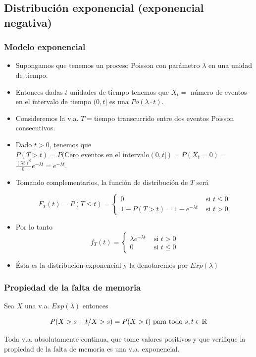 \subsection{Distribución exponencial (exponencial negativa)}
\begin{frame}

\frametitle{Modelo exponencial}

\begin{itemize}
\item      Supongamos que tenemos un proceso Poisson con parámetro $\lambda$ en una unidad de tiempo.
\item    Entonces dadas $t$ unidades de tiempo tenemos que $X_{t}=$ número de eventos en el intervalo de tiempo $(0,t]$ es una $Po(\lambda\cdot t)$. 
\item Consideremos la v.a. $T=$tiempo transcurrido entre dos eventos Poisson consecutivos.
\item Dado $t>0$, tenemos que 
$P(T>t)=P(\mbox{Cero eventos en el intervalo}(0,t])=P(X_{t}=0)= $
$\frac{(\lambda t)^0}{0!} e^{-\lambda t}=e^{-\lambda t}.$
\end{itemize}
\end{frame}

\begin{frame}
\begin{itemize}
\item   Tomando complementarios, la función de distribución de $T$ será

         $$F_{T}(t)=P(T\leq t)=\left\{\begin{array}{ll} 0 &\mbox{ si } t\leq 0\\
          1-P(T>t)=1-e^{-\lambda t}& \mbox{ si } t>0\end{array}\right.$$
\item Por lo tanto
         $$f_{T}(t)=\left\{\begin{array}{ll}
         \lambda e^{-\lambda t} & \mbox{ si }  t>0\\
         0 & \mbox{ si } t\leq 0
         \end{array}\right.$$
\item Ésta es la distribución exponencial y la denotaremos por $Exp(\lambda)$
\end{itemize}
\end{frame}

\begin{frame}
\frametitle{Propiedad de la falta de memoria}
Sea $X$  una v.a. $Exp(\lambda)$ entonces

          $$P(X>s+t/X>s)=P(X>t)\mbox{  para todo } s,t\in \mathbb{R}$$

          Toda v.a. absolutamente continua, que tome valores positivos
          y que verifique la propiedad de la falta de memoria es una v.a.
          exponencial.
\end{frame}


